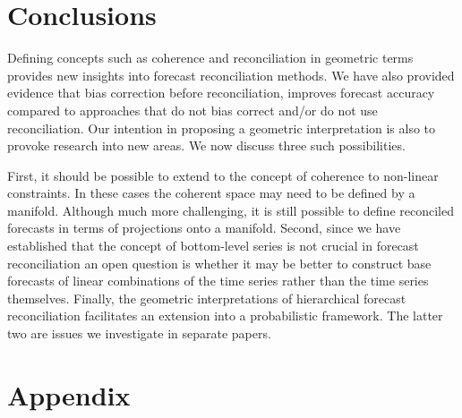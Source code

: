 \documentclass[12pt]{article}
\theoremstyle{definition}
\begin{document}
	
\section{Conclusions} \label{sec:conclusions}
	
	
	Defining concepts such as coherence and reconciliation in geometric terms provides new insights into forecast reconciliation methods.  We have also provided evidence that bias correction before reconciliation, improves forecast accuracy compared to approaches that do not bias correct and/or do not use reconciliation. Our intention in proposing a geometric interpretation is also to provoke research into new areas.  We now discuss three such possibilities.
	
	First, it should be possible to extend to the concept of coherence to non-linear constraints.  In these cases the coherent space may need to be defined by a manifold.  Although much more challenging, it is still possible to define reconciled forecasts in terms of projections onto a manifold.  Second, since we have established that the concept of bottom-level series is not crucial in forecast reconciliation an open question is whether it may be better to construct base forecasts of linear combinations of the time series rather than the time series themselves.  Finally, the geometric interpretations of hierarchical forecast reconciliation facilitates an extension into a probabilistic framework. The latter two are issues we investigate in separate papers.

\clearpage
	\section{Appendix} 
\end{document}
